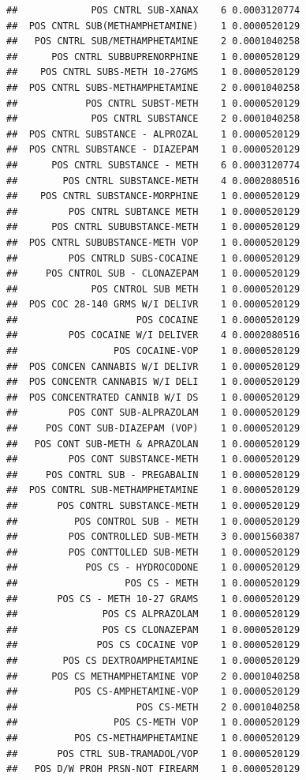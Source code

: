 \documentclass[]{book}
\begin{document}
\begin{verbatim}
##             POS CNTRL SUB-XANAX    6 0.0003120774
##  POS CNTRL SUB(METHAMPHETAMINE)    1 0.0000520129
##   POS CNTRL SUB/METHAMPHETAMINE    2 0.0001040258
##      POS CNTRL SUBBUPRENORPHINE    1 0.0000520129
##    POS CNTRL SUBS-METH 10-27GMS    1 0.0000520129
##  POS CNTRL SUBS-METHAMPHETAMINE    2 0.0001040258
##            POS CNTRL SUBST-METH    1 0.0000520129
##             POS CNTRL SUBSTANCE    2 0.0001040258
##  POS CNTRL SUBSTANCE - ALPROZAL    1 0.0000520129
##  POS CNTRL SUBSTANCE - DIAZEPAM    1 0.0000520129
##      POS CNTRL SUBSTANCE - METH    6 0.0003120774
##        POS CNTRL SUBSTANCE-METH    4 0.0002080516
##    POS CNTRL SUBSTANCE-MORPHINE    1 0.0000520129
##         POS CNTRL SUBTANCE METH    1 0.0000520129
##      POS CNTRL SUBUBSTANCE-METH    1 0.0000520129
##  POS CNTRL SUBUBSTANCE-METH VOP    1 0.0000520129
##         POS CNTRLD SUBS-COCAINE    1 0.0000520129
##     POS CNTROL SUB - CLONAZEPAM    1 0.0000520129
##             POS CNTROL SUB METH    1 0.0000520129
##  POS COC 28-140 GRMS W/I DELIVR    1 0.0000520129
##                     POS COCAINE    1 0.0000520129
##         POS COCAINE W/I DELIVER    4 0.0002080516
##                 POS COCAINE-VOP    1 0.0000520129
##  POS CONCEN CANNABIS W/I DELIVR    1 0.0000520129
##  POS CONCENTR CANNABIS W/I DELI    1 0.0000520129
##  POS CONCENTRATED CANNIB W/I DS    1 0.0000520129
##         POS CONT SUB-ALPRAZOLAM    1 0.0000520129
##     POS CONT SUB-DIAZEPAM (VOP)    1 0.0000520129
##   POS CONT SUB-METH & APRAZOLAN    1 0.0000520129
##         POS CONT SUBSTANCE-METH    1 0.0000520129
##     POS CONTRL SUB - PREGABALIN    1 0.0000520129
##  POS CONTRL SUB-METHAMPHETAMINE    1 0.0000520129
##       POS CONTRL SUBSTANCE-METH    1 0.0000520129
##          POS CONTROL SUB - METH    1 0.0000520129
##         POS CONTROLLED SUB-METH    3 0.0001560387
##         POS CONTTOLLED SUB-METH    1 0.0000520129
##            POS CS - HYDROCODONE    1 0.0000520129
##                   POS CS - METH    1 0.0000520129
##       POS CS - METH 10-27 GRAMS    1 0.0000520129
##               POS CS ALPRAZOLAM    1 0.0000520129
##               POS CS CLONAZEPAM    1 0.0000520129
##              POS CS COCAINE VOP    1 0.0000520129
##        POS CS DEXTROAMPHETAMINE    1 0.0000520129
##      POS CS METHAMPHETAMINE VOP    2 0.0001040258
##          POS CS-AMPHETAMINE-VOP    1 0.0000520129
##                     POS CS-METH    2 0.0001040258
##                 POS CS-METH VOP    1 0.0000520129
##          POS CS-METHAMPHETAMINE    1 0.0000520129
##       POS CTRL SUB-TRAMADOL/VOP    1 0.0000520129
##   POS D/W PROH PRSN-NOT FIREARM    1 0.0000520129

\end{verbatim}
\end{document}
